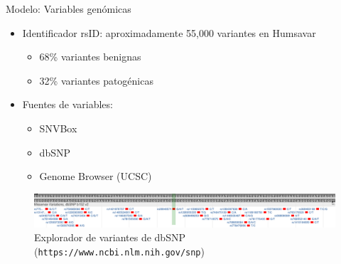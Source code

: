 \documentclass[
  spanish,
  ignorenonframetext,
]{beamer}
\providecommand{\tightlist}{%
  \setlength{\itemsep}{0pt}\setlength{\parskip}{0pt}}
\begin{document}
\begin{frame}{Modelo: Variables genómicas}
\protect\hypertarget{modelo-variables-genuxf3micas}{}

\begin{itemize}
\tightlist
\item
  Identificador rsID: aproximadamente 55,000 variantes en Humsavar

  \begin{itemize}
  \tightlist
  \item
    68\% variantes benignas
  \item
    32\% variantes patogénicas
  \end{itemize}
\item
  Fuentes de variables:

  \begin{itemize}
  \tightlist
  \item
    SNVBox
  \item
    dbSNP
  \item
    Genome Browser (UCSC)
  \end{itemize}
\end{itemize}

\begin{figure}
\centering
\includegraphics[width=4.6875in,height=\textheight]{variation.pdf}
\caption{Explorador de variantes de dbSNP
(\texttt{https://www.ncbi.nlm.nih.gov/snp})}
\end{figure}

\end{frame}
\end{document}
